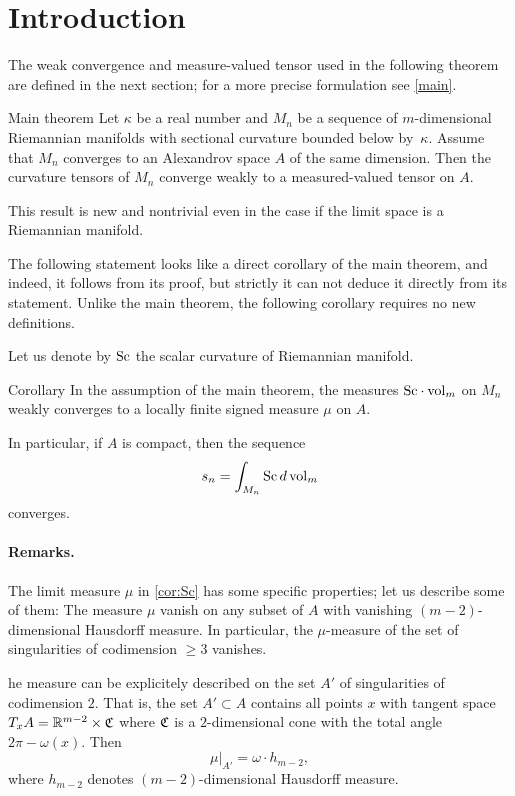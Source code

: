 \section{Introduction}

The weak convergence and measure-valued tensor used in the following theorem are defined in the next section;
for a more precise formulation see \ref{main}.

\begin{thm}{Main theorem}
Let $\kappa$ be a real number and 
$M_n$ be a sequence of $m$-dimensional Riemannian manifolds with sectional curvature bounded below by~$\kappa$.
Assume that $M_n$ converges to an Alexandrov space $A$ of the same dimension.
Then the curvature tensors of $M_n$ converge weakly to a measured-valued tensor on $A$.
\end{thm}

This result is new and nontrivial even in the case if the limit space is a Riemannian manifold.


The following statement looks like a direct corollary of the main theorem, 
and indeed, it follows from its proof, but strictly it can not deduce it directly from its statement.
Unlike the main theorem, the following corollary requires no new definitions.
 
Let us denote by $\operatorname{Sc}$ the scalar curvature of Riemannian manifold.


\begin{thm}{Corollary}\label{cor:Sc}
In the assumption of the main theorem,
the measures $\Sc\cdot \vol_m$ on $M_n$ weakly converges to a locally finite signed measure $\mu$  on $A$.

In particular, if $A$ is compact, then the sequence
\[s_n=\int_{M_n}\operatorname{Sc} d\operatorname{vol}_m\]
converges.
\end{thm}


\paragraph{Remarks.}
The limit measure $\mu$ in \ref{cor:Sc} has some specific properties;
let us describe some of them:
The measure $\mu$ vanish on any subset of $A$ with vanishing $(m-2)$-dimensional Hausdorff measure.
In particular, the $\mu$-measure of the set of singularities
of codimension $\ge 3$ vanishes.

he measure can be explicitely described 
on the set $A'$ of singularities
of codimension $2$. That is, the set $A'\subset A$
contains all points $x$ with tangent space
$T_xA=\mathbb{R}^{m-2}\times \mathfrak{C}$
where $\mathfrak{C}$ is a $2$-dimensional cone
with the total angle $2\pi-\omega(x)$.
Then 
$$\mu|_{A'}=\omega\cdot h_{m-2},$$
where $h_{m-2}$ denotes $(m-2)$-dimensional Hausdorff measure.



